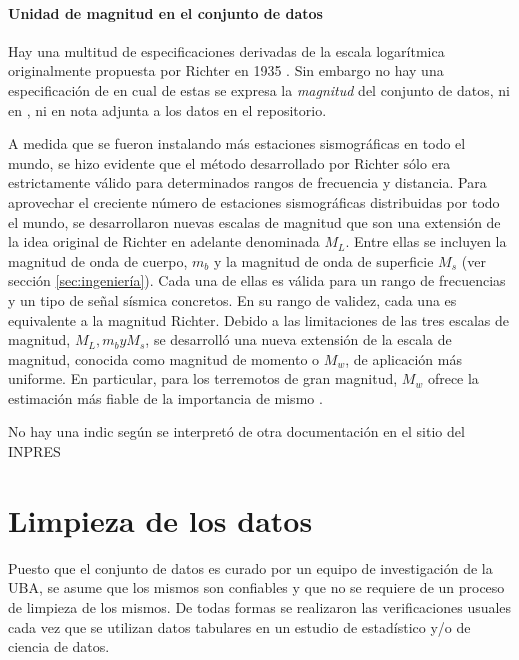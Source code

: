 \documentclass[a4paper]{report}
\begin{document}
\paragraph{Unidad de magnitud en el conjunto de datos}

Hay una multitud de especificaciones derivadas de la escala logarítmica originalmente propuesta por Richter en 1935 \cite[sección 4.2.3]{fowler_solid_1990}.
Sin embargo no hay una especificación de en cual de estas se expresa la \emph{magnitud} del conjunto de datos, ni en \cite{daniela_parada_ic-datasets-docencia_nodate}, ni en nota adjunta a los datos en el repositorio. 

A medida que se fueron instalando más estaciones sismográficas en todo el mundo, se hizo evidente que el método desarrollado por Richter sólo era estrictamente válido para determinados rangos de frecuencia y distancia.
Para aprovechar el creciente número de estaciones sismográficas distribuidas por todo el mundo, se desarrollaron nuevas escalas de magnitud que son una extensión de la idea original de Richter en adelante denominada \(M_L\).
Entre ellas se incluyen la magnitud de onda de cuerpo, \(m_b\) y la magnitud de onda de superficie \(M_s\) (ver sección \ref{sec:ingeniería}).
Cada una de ellas es válida para un rango de frecuencias y un tipo de señal sísmica concretos.
En su rango de validez, cada una es equivalente a la magnitud Richter.
Debido a las limitaciones de las tres escalas de magnitud, \(M_L, m_b y M_s\), se desarrolló una nueva extensión de la escala de magnitud, conocida como magnitud de momento o \(M_w\), de aplicación más uniforme.
En particular, para los terremotos de gran magnitud, \(M_w\) ofrece la estimación más fiable de la importancia de mismo \cite{noauthor_moment_nodate}.
	


No hay una indic
según se interpretó de otra documentación en el sitio del INPRES


\section{Limpieza de los datos}

Puesto que el conjunto de datos es curado por un equipo de investigación de la UBA, se asume que los mismos son confiables y que no se requiere de un proceso de limpieza de los mismos.
De todas formas se realizaron las verificaciones usuales cada vez que se utilizan datos tabulares en un estudio de estadístico y/o de ciencia de datos.
\end{document}
